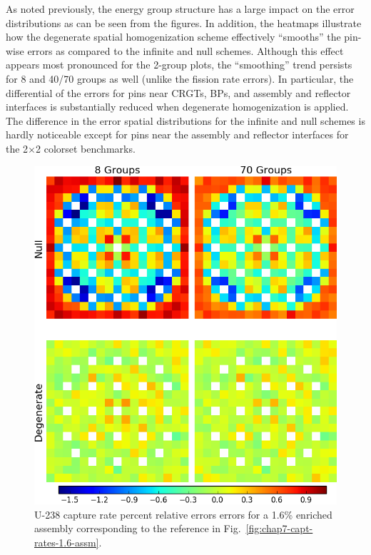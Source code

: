 As noted previously, the energy group structure has a large impact on the error distributions as can be seen from the figures. In addition, the heatmaps illustrate how the degenerate spatial homogenization scheme effectively ``smooths'' the pin-wise errors as compared to the infinite and null schemes. Although this effect appears most pronounced for the 2-group plots, the ``smoothing'' trend persists for 8 and 40/70 groups as well (unlike the fission rate errors). In particular, the differential of the errors for pins near \acp{CRGT}, \acp{BP}, and assembly and reflector interfaces is substantially reduced when degenerate homogenization is applied. The difference in the error spatial distributions for the infinite and null schemes is hardly noticeable except for pins near the assembly and reflector interfaces for the 2$\times$2 colorset benchmarks.

\begin{figure}[h!]
\centering
\includegraphics[width=\linewidth]{figures/quantification/assm-16/capt-err}
\vspace{2mm}
\caption[U-238 capture rate errors for a 1.6\% enriched assembly]{U-238 capture rate percent relative errors errors for a 1.6\% enriched assembly corresponding to the reference in Fig.~\ref{fig:chap7-capt-rates-1.6-assm}.}
\label{fig:chap8-assm-1.6-capt-err}
\end{figure}

